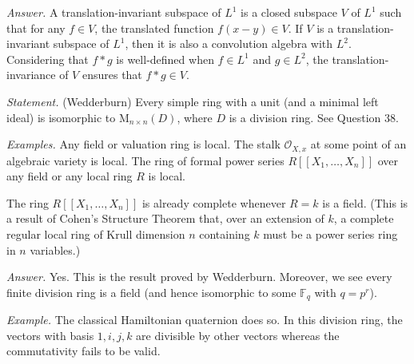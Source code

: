 \documentclass{mathproblems}
\newcommand\OO{\mathcal{O}}
\newcommand\F{\mathbb{F}}
\begin{document}
\begin{questions}

\textit{Answer.} A translation-invariant subspace of $L^1$ is a closed subspace $V$ of $L^1$ such that for any $f \in V$, the translated function $f(x - y)\in V$. If $V$ is a translation-invariant subspace of $L^1$, then it is also a convolution algebra with $L^2$. Considering that $f\ast g$ is well-defined when $f\in L^1$ and $g\in L^2$, the translation-invariance of $V$ ensures that $f\ast g\in V$.





\textit{Statement.} (Wedderburn) Every simple ring with a unit (and a minimal left ideal) is isomorphic to $\mathrm{M}_{n\times n}(D)$, where $D$ is a division ring. See Question 38.


\textit{Examples.} Any field or valuation ring is local. The stalk $\OO_{X,x}$ at some point of an algebraic variety is local. The ring of formal power series $R[\![X_1,\ldots,X_n]\!]$ over any field or any local ring $R$ is local. 

The ring $R[\![X_1,\ldots,X_n]\!]$ is already complete whenever $R=k$ is a field. (This is a result of Cohen's Structure Theorem that, over an extension of $k$, a complete regular local ring of Krull dimension $n$ containing $k$ must be a power series ring in $n$ variables.)





\textit{Answer.} Yes. This is the result proved by Wedderburn. Moreover, we see every finite division ring is a field (and hence isomorphic to some $\F_q$ with $q=p^r$).

\textit{Example.} The classical Hamiltonian quaternion does so. In this division ring, the vectors with basis ${1,i,j,k}$ are divisible by other vectors whereas the commutativity fails to be valid. 



\end{questions}
\end{document}
